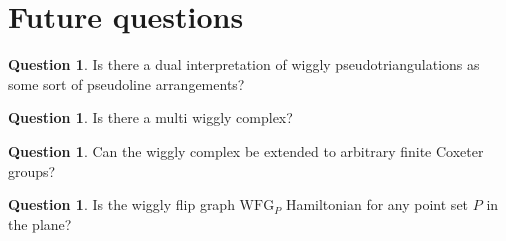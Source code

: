 \documentclass{amsart}
\theoremstyle{definition}
\newtheorem{question}[theorem]{Question}
\newcommand{\wigglyFlipGraph}{\mathrm{WFG}} %
\begin{document}
\section{Future questions}
\begin{question}
    Is there a dual interpretation of wiggly pseudotriangulations as some sort of pseudoline arrangements?
\end{question}

\begin{question}
    Is there a multi wiggly complex?
\end{question}

\begin{question}
    Can the wiggly complex be extended to arbitrary finite Coxeter groups?
\end{question}

\begin{question}
    Is the wiggly flip graph $\wigglyFlipGraph_P$ Hamiltonian for any point set $P$ in the plane?
\end{question}






\end{document}
